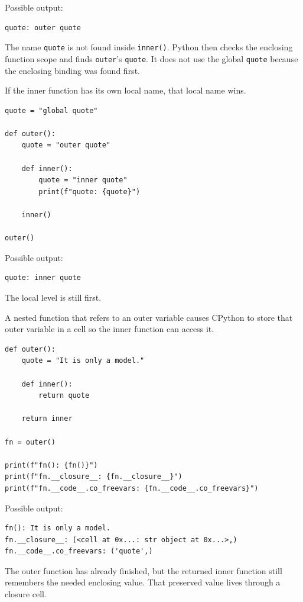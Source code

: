 Possible output:

\begin{verbatim}
quote: outer quote
\end{verbatim}

The name \texttt{quote} is not found inside \texttt{inner()}. Python then checks the enclosing function scope and finds \texttt{outer}'s \texttt{quote}. It does not use the global \texttt{quote} because the enclosing binding was found first.

If the inner function has its own local name, that local name wins.

\begin{verbatim}
quote = "global quote"

def outer():
    quote = "outer quote"

    def inner():
        quote = "inner quote"
        print(f"quote: {quote}")

    inner()

outer()
\end{verbatim}

Possible output:

\begin{verbatim}
quote: inner quote
\end{verbatim}

The local level is still first.

A nested function that refers to an outer variable causes CPython to store that outer variable in a cell so the inner function can access it.

\begin{verbatim}
def outer():
    quote = "It is only a model."

    def inner():
        return quote

    return inner

fn = outer()

print(f"fn(): {fn()}")
print(f"fn.__closure__: {fn.__closure__}")
print(f"fn.__code__.co_freevars: {fn.__code__.co_freevars}")
\end{verbatim}

Possible output:

\begin{verbatim}
fn(): It is only a model.
fn.__closure__: (<cell at 0x...: str object at 0x...>,)
fn.__code__.co_freevars: ('quote',)
\end{verbatim}

The outer function has already finished, but the returned inner function still remembers the needed enclosing value. That preserved value lives through a closure cell.

